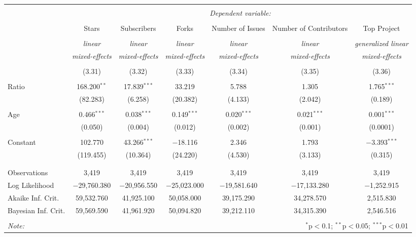 
\begin{tabular}{@{\extracolsep{5pt}}lcccccc}
\\[-1.8ex]\hline
\hline \\[-1.8ex]
 & \multicolumn{6}{c}{\textit{Dependent variable:}} \\
\cline{2-7}
\\[-1.8ex] & Stars & Subscribers & Forks & Number of Issues & Number of Contributors & Top Project \\
\\[-1.8ex] & \textit{linear} & \textit{linear} & \textit{linear} & \textit{linear} & \textit{linear} & \textit{generalized linear} \\
 & \textit{mixed-effects} & \textit{mixed-effects} & \textit{mixed-effects} & \textit{mixed-effects} & \textit{mixed-effects} & \textit{mixed-effects} \\
\\[-1.8ex] & (3.31) & (3.32) & (3.33) & (3.34) & (3.35) & (3.36)\\
\hline \\[-1.8ex]
 Ratio & 168.200$^{**}$ & 17.839$^{***}$ & 33.219 & 5.788 & 1.305 & 1.765$^{***}$ \\
  & (82.283) & (6.258) & (20.382) & (4.133) & (2.042) & (0.189) \\
  & & & & & & \\
 Age & 0.466$^{***}$ & 0.038$^{***}$ & 0.149$^{***}$ & 0.020$^{***}$ & 0.021$^{***}$ & 0.001$^{***}$ \\
  & (0.050) & (0.004) & (0.012) & (0.002) & (0.001) & (0.0001) \\
  & & & & & & \\
 Constant & 102.770 & 43.266$^{***}$ & $-$18.116 & 2.346 & 1.793 & $-$3.393$^{***}$ \\
  & (119.455) & (10.364) & (24.220) & (4.530) & (3.133) & (0.315) \\
  & & & & & & \\
\hline \\[-1.8ex]
Observations & 3,419 & 3,419 & 3,419 & 3,419 & 3,419 & 3,419 \\
Log Likelihood & $-$29,760.380 & $-$20,956.550 & $-$25,023.000 & $-$19,581.640 & $-$17,133.280 & $-$1,252.915 \\
Akaike Inf. Crit. & 59,532.760 & 41,925.100 & 50,058.000 & 39,175.290 & 34,278.570 & 2,515.830 \\
Bayesian Inf. Crit. & 59,569.590 & 41,961.920 & 50,094.820 & 39,212.110 & 34,315.390 & 2,546.516 \\
\hline
\hline \\[-1.8ex]
\textit{Note:}  & \multicolumn{6}{r}{$^{*}$p$<$0.1; $^{**}$p$<$0.05; $^{***}$p$<$0.01} \\
\end{tabular}

